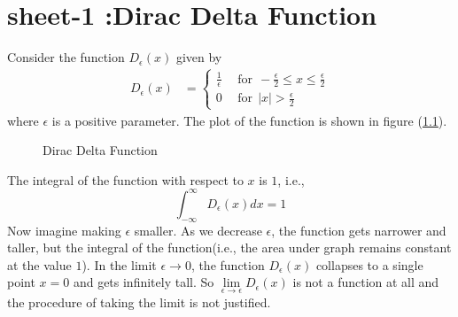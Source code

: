 
\chapter{sheet-1 :Dirac Delta Function}
\label{chapter1.dirac-delta}

\ifpdf
\graphicspath{{Chapter1/figs/}}
\else
\graphicspath{{Chapter1/figs/}}
\fi


	Consider the function $D_\epsilon(x)$ given by
	\begin{eqnarray}
	D_\epsilon(x) &= 
		\begin{cases}
			\frac{1}{\epsilon} \ \ &\text{for} \ \  -\frac{\epsilon}{2} \leq x \leq \frac{\epsilon}{2} \\
			0 \ \ &\text{for} \ \  |x| > \frac{\epsilon}{2} 
		\end{cases}
	\end{eqnarray}
	where $\epsilon$ is a positive parameter. The plot of the function is shown in figure (\ref{fig.cpt1.figure1}).
	
	\begin{figure}
		\centering
		\caption{Dirac Delta Function}
		\label{fig.cpt1.figure1}
	\end{figure}
	
	The integral of the function with respect to $x$ is $1$, i.e.,
	\begin{equation}
		\int_{-\infty}^{\infty} D_\epsilon(x) dx = 1
	\end{equation}
	Now imagine making $\epsilon$ smaller. As we decrease $\epsilon$, the function gets narrower and taller, but the integral of the function(i.e., the area under graph remains constant at the value $1$).
	In the limit $\epsilon \rightarrow 0$, the function $D_\epsilon(x)$ collapses to a single  point $x=0$ and gets infinitely tall. So $\lim\limits_{\epsilon \rightarrow \epsilon} D_\epsilon(x)$ is not a function at all and the procedure of taking the limit is not justified.
	\\
	
